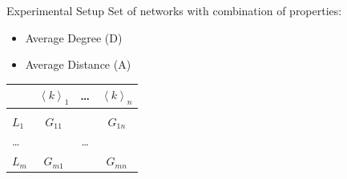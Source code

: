 \documentclass[12pt, notes=show]{beamer}
\begin{document}
	\begin{frame}{Experimental Setup}
		Set of networks with combination of properties:
		\begin{itemize}
			\item Average Degree (D)
			\item Average Distance (A)
		\end{itemize}
		\begin{center}
			\begin{tabular}{l|ccc}
				& $\left\langle k \right\rangle_1$ & \dots & $\left\langle k \right\rangle_n$\\
				\hline\\
				$L_1$	& $G_{11}$	& 	& $G_{1n}$	\\	
				\dots	&		&\dots	&		\\
				$L_m$	& $G_{m1}$	& 	& $G_{mn}$	\\	
			\end{tabular}
		\end{center}

	\end{frame}
\end{document}
